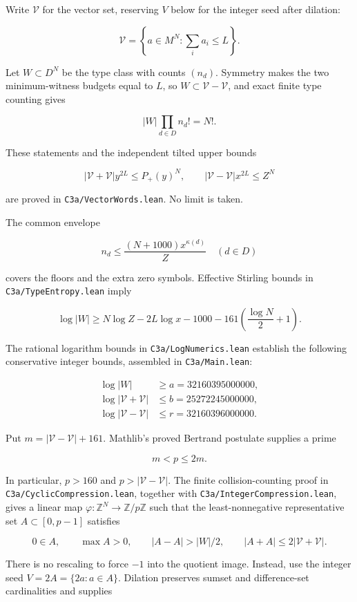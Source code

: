 \documentclass[
  10pt,
]{article}
\begin{document}
Write \(\mathcal V\) for the vector set, reserving \(V\) below for the
integer seed after dilation:

\[
\mathcal V=\left\{a\in M^N:\sum_i a_i\le L\right\}.
\]

Let \(W\subset D^N\) be the type class with counts \((n_d)\). Symmetry
makes the two minimum-witness budgets equal to \(L\), so
\(W\subset\mathcal V-\mathcal V\), and exact finite type counting gives

\[
|W|\prod_{d\in D}n_d!=N!.
\]

These statements and the independent tilted upper bounds

\[
|\mathcal V+\mathcal V|y^{2L}\le P_+(y)^N,
\qquad
|\mathcal V-\mathcal V|x^{2L}\le Z^N
\]

are proved in \texttt{C3a/VectorWords.lean}. No limit is taken.

The common envelope

\[
n_d\le\frac{(N+1000)x^{\kappa(d)}}Z\quad(d\in D)
\]

covers the floors and the extra zero symbols. Effective Stirling bounds
in \texttt{C3a/TypeEntropy.lean} imply

\[
\log|W|\ge N\log Z-2L\log x-1000
 -161\left(\frac{\log N}{2}+1\right).
\]

The rational logarithm bounds in \texttt{C3a/LogNumerics.lean} establish
the following conservative integer bounds, assembled in
\texttt{C3a/Main.lean}:

\[
\begin{aligned}
\log|W|&\ge a=32160395000000,\\
\log|\mathcal V+\mathcal V|&\le b=25272245000000,\\
\log|\mathcal V-\mathcal V|&\le r=32160396000000.
\end{aligned}
\]

Put \(m=|\mathcal V-\mathcal V|+161\). Mathlib's proved Bertrand
postulate supplies a prime

\[
m<p\le2m.
\]

In particular, \(p>160\) and \(p>|\mathcal V-\mathcal V|\). The finite
collision-counting proof in \texttt{C3a/CyclicCompression.lean},
together with \texttt{C3a/IntegerCompression.lean}, gives a linear map
\(\varphi:\mathbb Z^N\to\mathbb Z/p\mathbb Z\) such that the
least-nonnegative representative set \(A\subset[0,p-1]\) satisfies

\[
0\in A,\qquad \max A>0,\qquad
|A-A|>|W|/2,\qquad |A+A|\le2|\mathcal V+\mathcal V|.
\]

There is no rescaling to force \(-1\) into the quotient image. Instead,
use the integer seed \(V=2A=\{2a:a\in A\}\). Dilation preserves sumset
and difference-set cardinalities and supplies
\end{document}
